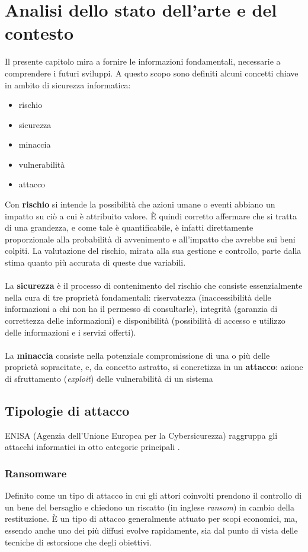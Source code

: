 \documentclass[12pt,a4paper,twoside]{report}
\begin{document}
\chapter{Analisi dello stato dell'arte e del contesto}\label{chap:artState}
Il presente capitolo mira a fornire le informazioni fondamentali, necessarie a comprendere i futuri sviluppi. A questo scopo sono definiti alcuni concetti chiave in ambito di sicurezza informatica:
\begin{itemize}
    \item rischio
    \item sicurezza
    \item minaccia
    \item vulnerabilit\`a
    \item attacco
\end{itemize}
Con \textbf{rischio} si intende la possibilit\`a che azioni umane o eventi  abbiano un impatto su ci\`o a cui \`e attribuito valore. \`E quindi corretto affermare che si tratta di una grandezza, e come tale \`e quantificabile, \`e infatti direttamente proporzionale alla probabilit\`a di avvenimento e all'impatto che avrebbe sui beni colpiti. La valutazione del rischio, mirata alla sua gestione e controllo, parte dalla stima quanto pi\`u accurata di queste due variabili.\\
\\
La \textbf{sicurezza} \`e il processo di contenimento del rischio che consiste essenzialmente nella cura di tre propriet\`a fondamentali: riservatezza (inaccessibilit\`a delle informazioni a chi non ha il permesso di consultarle), integrit\`a (garanzia di correttezza delle informazioni) e disponibilit\`a (possibilit\`a di accesso e utilizzo delle informazioni e i servizi offerti).\\
\\
La \textbf{minaccia} consiste nella potenziale compromissione di una o pi\`u delle propriet\`a sopracitate, e, da concetto astratto, si concretizza in un \textbf{attacco}: azione di sfruttamento (\textit{exploit}) delle vulnerabilit\`a di un sistema\\

\section{Tipologie di attacco}
ENISA (Agenzia dell'Unione Europea per la Cybersicurezza) raggruppa gli attacchi informatici in otto categorie principali \cite{enisa_threat_landscape}.
\subsection{Ransomware}
Definito come un tipo di attacco in cui gli attori coinvolti prendono il controllo di un bene del bersaglio e chiedono un riscatto (in inglese \textit{ransom}) in cambio della restituzione. \`E un tipo di attacco  generalmente attuato per scopi economici, ma, essendo anche uno dei pi\`u diffusi evolve rapidamente, sia dal punto di vista delle tecniche di estorsione che degli obiettivi.\\
\end{document}
